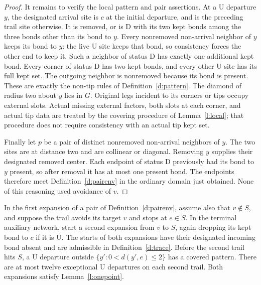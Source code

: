 \begin{proof}
It remains to verify the local pattern and pair assertions.  At a
\(\mathrm U\) departure \(y\), the designated arrival site is
\(c\) at the initial departure, and is the preceding trail site
otherwise.  It is removed, or is \(\mathrm D\) with its two kept
bonds among the three bonds other than its bond to \(y\).
Every nonremoved non-arrival neighbor of \(y\) keeps its bond to
\(y\): the live \(\mathrm U\) site keeps that bond, so consistency
forces the other end to keep it.  Such a neighbor of status
\(\mathrm D\) has exactly one additional kept bond.  Every corner
of status \(\mathrm D\) has two kept bonds, and every other
\(\mathrm U\) site has its full kept set.  The outgoing neighbor
is nonremoved because its bond is present.  These are exactly the
non-tip rules of Definition~\ref{d:pattern}.  The diamond of radius
two about \(y\) lies in \(G\).  Original legs incident to its
corners or tips occupy external slots.  Actual missing external
factors, both slots at each corner, and actual tip data are treated
by the covering procedure of Lemma~\ref{l:local}; that procedure
does not require consistency with an actual tip kept set.

Finally let \(p\) be a pair of distinct nonremoved non-arrival
neighbors of \(y\).  The two sites are at distance two and are
collinear or diagonal.  Removing \(y\) supplies their designated
removed center.  Each endpoint of status \(\mathrm D\) previously
had its bond to \(y\) present, so after removal it has at most one
present bond.  The endpoints therefore meet
Definition~\ref{d:pairenv} in the ordinary domain just obtained.
None of this reasoning used avoidance of \(v\).
\end{proof}


\begin{lemma}\label{l:terminalcover}
In the first expansion of a pair of Definition~\ref{d:pairenv},
assume also that \(v\notin S\), and
suppose the trail avoids its target \(v\) and stops at \(e\in S\).
In the terminal auxiliary network, start a second expansion from \(v\)
to \(S\), again dropping its kept bond to \(c\) if it is \(\mathrm U\).
The starts of both expansions have their designated incoming bond
absent and are admissible in Definition~\ref{d:trace}.
Before the second trail hits \(S\), a \(\mathrm U\) departure
outside \(\{y':0<d(y',e)\le2\}\) has a covered pattern.
There are at most twelve exceptional \(\mathrm U\) departures
on each second trail. Both expansions satisfy Lemma~\ref{l:onepoint}.
\end{lemma}

